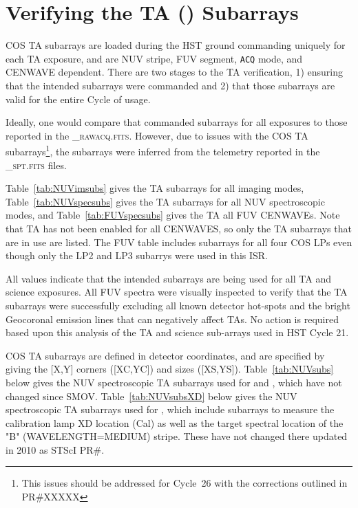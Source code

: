 \section{Verifying the TA (\tacq{ }) Subarrays}\label{sec:subarray}

COS TA subarrays are loaded during the HST ground commanding uniquely for each TA exposure,
and are NUV stripe, FUV segment, \texttt{ACQ} mode, and CENWAVE dependent.
There are two stages to the TA verification, 1) ensuring that the intended subarrays were commanded and
2) that those subarrays are valid for the entire Cycle of usage.

Ideally, one would compare that commanded subarrays for all exposures to those
reported in the \textsc{\_rawacq.fits}. However, due to issues with the
COS TA subarrays\footnote{This issues should be addressed for Cycle~26 with the corrections outlined in PR\#XXXXX},
the subarrays were inferred from the telemetry reported in the \textsc{\_spt.fits} files.

Table~\ref{tab:NUVimsubs} gives the TA subarrays for all imaging modes,
Table~\ref{tab:NUVspecsubs} gives the TA subarrays for all NUV spectroscopic modes,
and Table~\ref{tab:FUVspecsubs} gives the TA all FUV CENWAVEs. Note that TA has not
been enabled for all CENWAVES, so only the TA subarrays that are in use are listed.
The FUV table includes subarrays for all four COS LPs even though only the LP2 and LP3
subarrys were used in this ISR.

All values indicate that the intended subarrays are being used for all TA and science exposures. All FUV spectra were visually
inspected to verify that the TA subarrays were successfully excluding all known detector hot-spots and the
bright Geocoronal emission lines that can negatively affect TAs.  No action is required based upon this
analysis of the TA and science sub-arrays used in HST Cycle 21.

COS TA subarrays are defined in detector coordinates, and are specified by giving the [X,Y] corners ([XC,YC]) and sizes ([XS,YS]).
Table~\ref{tab:NUVsubs} below gives the NUV spectroscopic TA subarrays used for  and , which have not changed since SMOV.
Table~\ref{tab:NUVsubsXD} below gives the NUV spectroscopic TA subarrays used for , which include subarrays to measure the
calibration lamp XD location (Cal) as well as the target spectral location of the "B" (WAVELENGTH=MEDIUM) stripe.
These have not changed there updated in 2010 as STScI PR\#{}.

